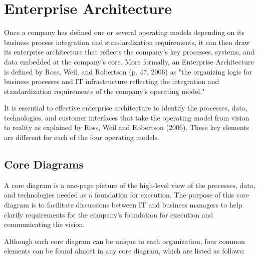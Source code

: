\chapter{Enterprise Architecture}
\label{ch:enterprise-architecture}

Once a company has defined one or several operating models depending on its business process integration and
standardization requirements, it can then draw its enterprise architecture that reflects the company’s key processes,
systems, and data embedded at the company's core.
More formally, an Enterprise Architecture is defined by Ross, Weil, and Robertson (p. 47, 2006) as
"the organizing logic for business processes and IT infrastructure reflecting the integration and standardization
requirements of the company's operating model."

It is essential to effective enterprise architecture to identify the processes, data, technologies, and
customer interfaces that take the operating model from vision to reality as explained
by Ross, Weil and Robertson (2006).
These key elements are different for each of the four operating models.

\section*{Core Diagrams}

A core diagram is a one-page picture of the high-level view of the processes, data, and technologies needed as a
foundation for execution.
The purpose of this core diagram is to facilitate discussions between IT and business managers to help clarify
requirements for the company's foundation for execution and communicating the vision.

Although each core diagram can be unique to each organization, four common elements can be found almost
in any core diagram, which are listed as follows:

